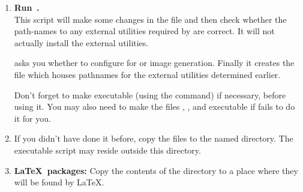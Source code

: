 \begin{enumerate}
%
%
\item 
\textbf{Run \,.} \\
This \Perl{} script will make some changes in the  file
and then check whether the path-names to any external utilities
required by  are correct.
It will not actually install the external utilities. 
\begin{changebar}
 asks you whether to configure for  or
 image generation.
Finally it creates the file  which houses pathnames for the
external utilities determined earlier.
\end{changebar}

Don't forget to make  executable 
(using the  command) if necessary, before using it. 
You may also need to make the files , 
,  and  executable 
if  fails to do it for you.

%
\item If you didn't have done it before, copy the files to the named
 directory.
The executable script  may reside outside this directory.



\item 
{}%
\textbf{\LaTeX\ packages:} Copy the contents of the 
directory to a place where they will be found by \LaTeX.
\end{enumerate}

